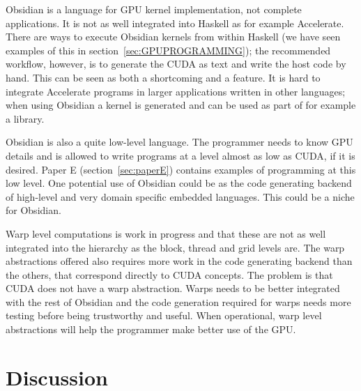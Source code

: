 \documentclass[a4paper]{book}
\begin{document}
Obsidian is a language for GPU kernel implementation, not complete applications. 
It is not as well integrated into Haskell as for example Accelerate. There are 
ways to execute Obsidian kernels from within Haskell (we have seen examples of this in 
section~\ref{sec:GPUPROGRAMMING}); the recommended workflow, 
however, is to generate the CUDA as text and write the host code by hand. This 
can be seen as both a shortcoming and a feature. It is hard to integrate 
Accelerate programs in larger applications written in other languages; when 
using Obsidian a kernel is generated and can be used as part of for example a library. 

Obsidian is also a quite low-level language. The programmer needs to know GPU details 
and is allowed to write programs at a level almost as low as CUDA, if it is desired. 
Paper E (section~\ref{sec:paperE}) contains examples of programming at this low level. 
One potential use of Obsidian could be as the code generating backend of high-level 
and very domain specific embedded languages. This could be a niche for Obsidian.  

Warp level computations is work in progress and that these are not as well integrated 
into the hierarchy as the block, thread and grid levels are. The warp abstractions 
offered also requires more work in the code generating backend than the others, 
that correspond directly to CUDA concepts. The problem is that CUDA does not have 
a warp abstraction. Warps needs to be better integrated with the rest of Obsidian 
and the code generation required for warps needs more testing before being 
trustworthy and useful. When operational, warp level abstractions will help 
the programmer make better use of the GPU. 



%
%

\section{Discussion} 

\end{document}
